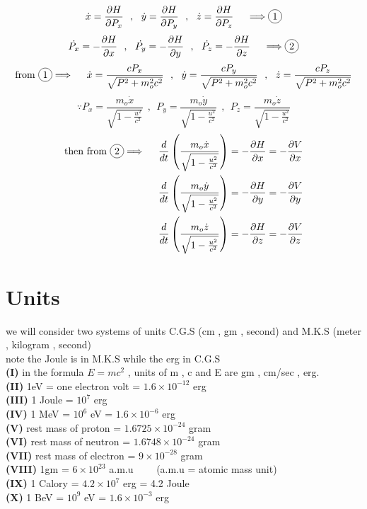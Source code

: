 \documentclass{article}
\begin{document}
\[
\dot{x} = \frac{\partial H}{\partial P_x}
\ \ , \ \
\dot{y} = \frac{\partial H}{\partial P_y}
\ \ , \ \
\dot{z} = \frac{\partial H}{\partial P_z}
\ \ \ \
\Longrightarrow  \circled{1}
\]
\[
\dot{P_x} =-\frac{\partial H}{\partial x}
\ \ , \ \
\dot{P_y} =-\frac{\partial H}{\partial y}
\ \ , \ \
\dot{P_z} =-\frac{\partial H}{\partial z}
\ \ \ \
\Longrightarrow  \circled{2}
\]
\[
\text{from }  \circled{1} \Longrightarrow 
\ \ \ \
\dot{x} = \frac{c P_x}{\sqrt{P^2 + m_o^2 c^2}}
\ \ , \ \
\dot{y} = \frac{c P_y}{\sqrt{P^2 + m_o^2 c^2}}
\ \ , \ \
\dot{z} = \frac{c P_z}{\sqrt{P^2 + m_o^2 c^2}}
\]
\[
\because
P_x = \frac{m_o \dot{x}}{\sqrt{1 - \frac{u^2}{c^2}}}
\ \ , \ \
P_y = \frac{m_o \dot{y}}{\sqrt{1 - \frac{u^2}{c^2}}}
\ \ , \ \
P_z = \frac{m_o \dot{z}}{\sqrt{1 - \frac{u^2}{c^2}}}
\]
\begin{align*}
    \text{then from }  \circled{2} \Longrightarrow 
    \ \ \ \
    \frac{d}{dt}\left(\frac{m_o \dot{x}}{\sqrt{1 - \frac{u^2}{c^2}}}\right) &= -\frac{\partial H}{\partial x} = -\frac{\partial V}{\partial x}\\
    \frac{d}{dt}\left(\frac{m_o \dot{y}}{\sqrt{1 - \frac{u^2}{c^2}}}\right) &= -\frac{\partial H}{\partial y} = -\frac{\partial V}{\partial y}\\
    \frac{d}{dt}\left(\frac{m_o \dot{z}}{\sqrt{1 - \frac{u^2}{c^2}}}\right) &= -\frac{\partial H}{\partial z} = -\frac{\partial V}{\partial z}
\end{align*}
\section{Units}
we will consider two systems of units C.G.S (cm , gm , second) and M.K.S (meter , kilogram , second)\\
note the Joule is in M.K.S while the erg in C.G.S
\\\textbf{(I)} in the formula $E = m c^2$ , units of m , c and E are gm , cm/sec , erg.
\\\textbf{(II)} 1eV = one electron volt = $1.6 \times 10^{-12}$ erg
\\\textbf{(III)} 1 Joule = $10^{7}$ erg
\\\textbf{(IV)} 1 MeV = $10^{6}$ eV = $1.6 \times 10^{-6}$ erg
\\\textbf{(V)} rest mass of proton = $1.6725 \times 10^{-24}$ gram
\\\textbf{(VI)} rest mass of neutron = $1.6748 \times 10^{-24}$ gram
\\\textbf{(VII)} rest mass of electron = $9 \times 10^{-28}$ gram
\\\textbf{(VIII)} 1gm = $6 \times 10^{23}$ a.m.u \ \ \ \ (a.m.u = atomic mass unit)
\\\textbf{(IX)} 1 Calory = $4.2 \times 10^7$ erg = 4.2 Joule
\\\textbf{(X)} 1 BeV = $10^{9}$ eV = $1.6 \times 10^{-3}$ erg
\end{document}
